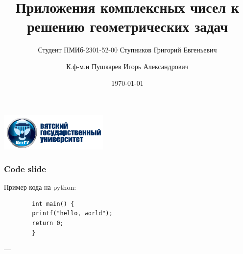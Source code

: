 \documentclass{beamer}
\title[]{Приложения комплексных чисел к решению геометрических задач}
\institute{ФГБОУ ВО «Вятский государственный университет»}
\date{\today}
\author{}
\author[Ступников Г.Е \and к.ф-м.н. Пушкарев И.А.]{Студент ПМИб-2301-52-00 Ступников Григорий Евгеньевич \and К.ф-м.н Пушкарев Игорь Александрович}
\begin{document}
\begin{frame}
    \centering\includegraphics[width=0.4\textwidth]{images/vyatsu_logo.png}\\
    \titlepage
\end{frame}
\begin{frame}[fragile=singleslide]
    \frametitle{Code slide}
Пример кода на python:
    \begin{verbatim}
        int main() {
        printf("hello, world");
        return 0;
        }
    \end{verbatim}
---
\end{frame}
\end{document}
